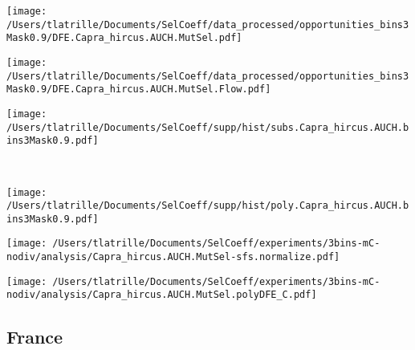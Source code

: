 \documentclass{article}
\begin{document}
    \begin{minipage}{0.32\linewidth}
        \texttt{[image: /Users/tlatrille/Documents/SelCoeff/data\_processed/opportunities\_bins3Mask0.9/DFE.Capra\_hircus.AUCH.MutSel.pdf]}
    \end{minipage}
    \begin{minipage}{0.32\linewidth}
        \texttt{[image: /Users/tlatrille/Documents/SelCoeff/data\_processed/opportunities\_bins3Mask0.9/DFE.Capra\_hircus.AUCH.MutSel.Flow.pdf]}
    \end{minipage}
    \begin{minipage}{0.32\linewidth}
        \texttt{[image: /Users/tlatrille/Documents/SelCoeff/supp/hist/subs.Capra\_hircus.AUCH.bins3Mask0.9.pdf]}
    \end{minipage}
    \\
    \begin{minipage}{0.32\linewidth}
        \texttt{[image: /Users/tlatrille/Documents/SelCoeff/supp/hist/poly.Capra\_hircus.AUCH.bins3Mask0.9.pdf]}
    \end{minipage}
    \begin{minipage}{0.32\linewidth}
        \texttt{[image: /Users/tlatrille/Documents/SelCoeff/experiments/3bins-mC-nodiv/analysis/Capra\_hircus.AUCH.MutSel-sfs.normalize.pdf]}
    \end{minipage}
    \begin{minipage}{0.32\linewidth}
        \texttt{[image: /Users/tlatrille/Documents/SelCoeff/experiments/3bins-mC-nodiv/analysis/Capra\_hircus.AUCH.MutSel.polyDFE\_C.pdf]}
    \end{minipage}
    \subsection{France}
\end{document}
